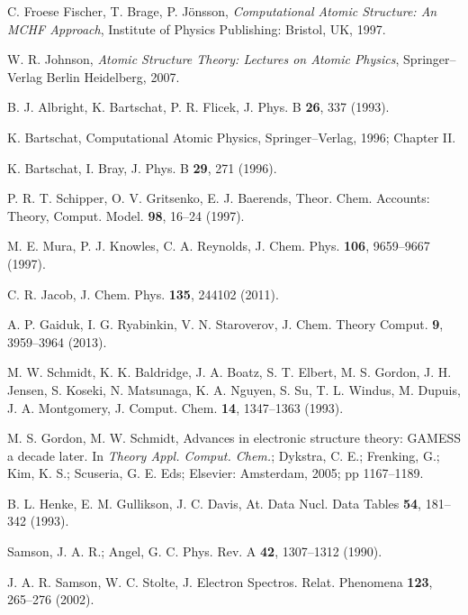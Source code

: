 \begin{thebibliography}{9}
C. Froese Fischer, T. Brage, P. J\"onsson,
\textit{Computational Atomic Structure: An MCHF Approach},
Institute of Physics Publishing: Bristol, UK, 1997.

W. R. Johnson, 
\textit{Atomic Structure Theory: Lectures on Atomic Physics},
Springer--Verlag Berlin Heidelberg, 2007.

B. J. Albright, K. Bartschat, P. R. Flicek,
J. Phys. B \textbf{26}, 337 (1993).

K. Bartschat, 
Computational Atomic Physics,
Springer--Verlag, 1996; Chapter II.

K. Bartschat, I. Bray, 
J. Phys. B \textbf{29}, 271 (1996).


P. R. T. Schipper, O. V. Gritsenko, E. J. Baerends, 
Theor. Chem. Accounts: Theory, Comput. Model. \textbf{98}, 16--24 (1997).

M. E. Mura, P. J. Knowles, C. A. Reynolds, 
J. Chem. Phys. \textbf{106}, 9659--9667 (1997).

C. R.  Jacob, 
J. Chem. Phys. \textbf{135}, 244102 (2011).

A. P. Gaiduk, I. G. Ryabinkin, V. N. Staroverov, 
J. Chem. Theory Comput. \textbf{9}, 3959--3964 (2013).

M. W. Schmidt, K. K. Baldridge, J. A. Boatz, S. T. Elbert, M. S. Gordon, 
J. H. Jensen, S. Koseki, N. Matsunaga, K. A. Nguyen, S. Su, T. L. Windus, 
M. Dupuis, J. A. Montgomery, 
J. Comput. Chem. \textbf{14}, 1347--1363 (1993).

M. S. Gordon, M. W. Schmidt, 
Advances in electronic structure theory: GAMESS a decade later. 
In \textit{Theory Appl. Comput. Chem.}; 
Dykstra, C. E.; Frenking, G.; Kim, K. S.; Scuseria, G. E. Eds;
Elsevier: Amsterdam, 2005; pp 1167--1189.


B. L. Henke, E. M. Gullikson, J. C. Davis, 
At. Data Nucl. Data Tables \textbf{54}, 181--342 (1993).

Samson, J. A. R.; Angel, G. C.
Phys. Rev. A \textbf{42}, 1307--1312 (1990).

J. A. R. Samson, W. C. Stolte, 
J. Electron Spectros. Relat. Phenomena \textbf{123}, 265--276 (2002).


\end{thebibliography}
